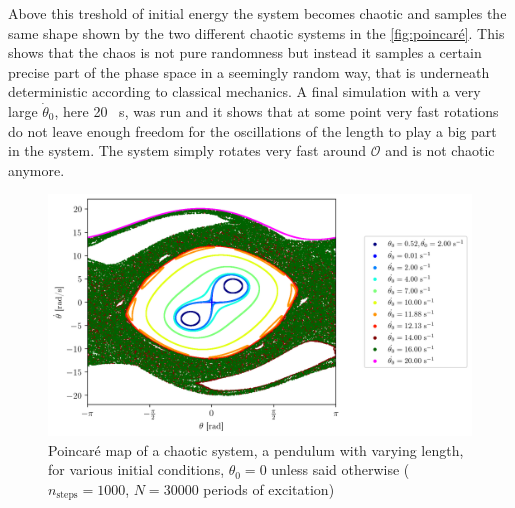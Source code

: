 Above this treshold of initial energy the system becomes chaotic and samples the same shape shown by the two different chaotic systems in the \autoref{fig:poincaré}. This shows that the chaos is not pure randomness but instead it samples a certain precise part of the phase space in a seemingly random way, that is underneath deterministic according to classical mechanics. A final simulation with a very large $\dot\theta_0$, here 20 \si{\per\second}, was run and it shows that at some point very fast rotations do not leave enough freedom for the oscillations of the length to play a big part in the system. The system simply rotates very fast around $\mathcal{O}$ and is not chaotic anymore.
\begin{figure}[H]
    \centering
    \includegraphics[width=\linewidth]{figures/poincare_overkill.png}
    \caption{Poincaré map of a chaotic system, a pendulum with varying length, for various initial conditions, \(\theta_0=0\) unless said otherwise (\(n_\textrm{steps}=1000\), \(N=30 000\) periods of excitation)}
    \label{fig:poincaré}
\end{figure}





